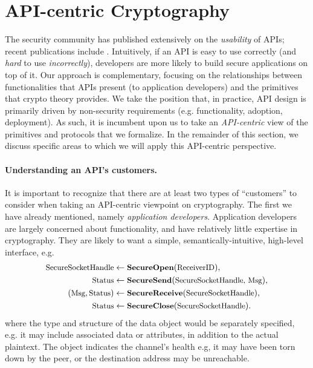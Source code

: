 \section{API-centric Cryptography}
The security community has published extensively on the \emph{usability} of
APIs; recent publications include \cite{ABF+,HHL+17,IKND16}.  Intuitively, if an
API is easy to use correctly (and \emph{hard} to use \emph{incorrectly}),
developers are more likely to build secure applications on top of it.
%
Our approach is complementary, focusing on the relationships between
functionalities that APIs present (to application developers) and the primitives
that crypto theory provides. We take the position that, in practice, API design
is primarily driven by non-security requirements (e.g. functionality, adoption,
deployment).
%
As such, it is incumbent upon us to take an \emph{API-centric} view of the
primitives and protocols that we formalize.  In the remainder of this section,
we discuss specific areas to which we will apply this API-centric perspective.
%


\paragraph{Understanding an API's customers. }
It is important to recognize that there are at least two types of ``customers''
to consider when taking an API-centric viewpoint on cryptography. The first we
have already mentioned, namely \emph{application developers}. Application developers
are largely concerned about functionality, and have relatively little expertise
in cryptography. They are likely to want a simple, semantically-intuitive,
high-level interface, e.g.
\begin{align*}
\textrm{\small SecureSocketHandle}&\gets\textrm{\small\bf SecureOpen}(\textrm{\small ReceiverID}), \\
\textrm{\small Status}&\gets\textrm{\small\bf SecureSend}(\textrm{\small SecureSocketHandle, Msg}),\\
  (\textrm{\small Msg}, \textrm{\small Status}) &\gets\textrm{\small\bf SecureReceive}(\textrm{\small SecureSocketHandle}), \\
\textrm{\small Status}&\gets\textrm{\small\bf SecureClose}(\textrm{\small SecureSocketHandle}).
\end{align*}
%
where the type and structure of the data object  would be
separately specified, e.g. it may include associated data or attributes, in
addition to the actual plaintext.
%
The object  indicates the channel's health e.g, it may have been
torn down by the peer, or the destination address may be unreachable.

